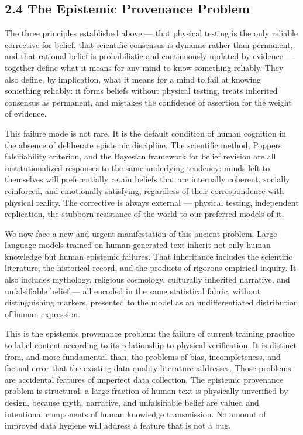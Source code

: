 \documentclass[
]{article}
\begin{document}
\subsection{2.4 The Epistemic Provenance
Problem}\label{the-epistemic-provenance-problem}

The three principles established above --- that physical testing is the
only reliable corrective for belief, that scientific consensus is
dynamic rather than permanent, and that rational belief is probabilistic
and continuously updated by evidence --- together define what it means
for any mind to know something reliably. They also define, by
implication, what it means for a mind to fail at knowing something
reliably: it forms beliefs without physical testing, treats inherited
consensus as permanent, and mistakes the confidence of assertion for the
weight of evidence.

This failure mode is not rare. It is the default condition of human
cognition in the absence of deliberate epistemic discipline. The
scientific method, Popper\textquotesingle s falsifiability criterion,
and the Bayesian framework for belief revision are all institutionalized
responses to the same underlying tendency: minds left to themselves will
preferentially retain beliefs that are internally coherent, socially
reinforced, and emotionally satisfying, regardless of their
correspondence with physical reality. The corrective is always external
--- physical testing, independent replication, the stubborn resistance
of the world to our preferred models of it.

We now face a new and urgent manifestation of this ancient problem.
Large language models trained on human-generated text inherit not only
human knowledge but human epistemic failures. That inheritance includes
the scientific literature, the historical record, and the products of
rigorous empirical inquiry. It also includes mythology, religious
cosmology, culturally inherited narrative, and unfalsifiable belief ---
all encoded in the same statistical fabric, without distinguishing
markers, presented to the model as an undifferentiated distribution of
human expression.

This is the epistemic provenance problem: the failure of current
training practice to label content according to its relationship to
physical verification. It is distinct from, and more fundamental than,
the problems of bias, incompleteness, and factual error that the
existing data quality literature addresses. Those problems are
accidental features of imperfect data collection. The epistemic
provenance problem is structural: a large fraction of human text is
physically unverified by design, because myth, narrative, and
unfalsifiable belief are valued and intentional components of human
knowledge transmission. No amount of improved data hygiene will address
a feature that is not a bug.
\end{document}
